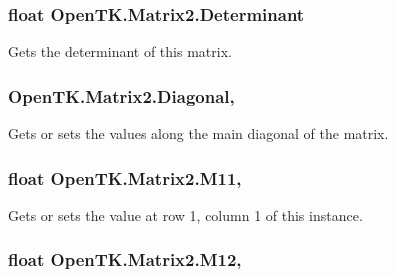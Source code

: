 \hypertarget{struct_open_t_k_1_1_matrix2_adcf885e885add38852d565b19b27a0e3}{
\subsubsection[{Determinant}]{\setlength{\rightskip}{0pt plus 5cm}float Open\-T\-K.\-Matrix2.\-Determinant\hspace{0.3cm}{\ttfamily [get]}}}\label{struct_open_t_k_1_1_matrix2_adcf885e885add38852d565b19b27a0e3}


Gets the determinant of this matrix. 

\hypertarget{struct_open_t_k_1_1_matrix2_af95195a62dda800e6466721bc6769bb1}{
\subsubsection[{Diagonal}]{ Open\-T\-K.\-Matrix2.\-Diagonal\hspace{0.3cm}{\ttfamily [get]}, {\ttfamily [set]}}}\label{struct_open_t_k_1_1_matrix2_af95195a62dda800e6466721bc6769bb1}


Gets or sets the values along the main diagonal of the matrix. 

\hypertarget{struct_open_t_k_1_1_matrix2_ac0096c57a845f57cad5b53117d97f90b}{
\subsubsection[{M11}]{\setlength{\rightskip}{0pt plus 5cm}float Open\-T\-K.\-Matrix2.\-M11\hspace{0.3cm}{\ttfamily [get]}, {\ttfamily [set]}}}\label{struct_open_t_k_1_1_matrix2_ac0096c57a845f57cad5b53117d97f90b}


Gets or sets the value at row 1, column 1 of this instance. 

\hypertarget{struct_open_t_k_1_1_matrix2_a20a739651456601282e0714c0e8a3f20}{
\subsubsection[{M12}]{\setlength{\rightskip}{0pt plus 5cm}float Open\-T\-K.\-Matrix2.\-M12\hspace{0.3cm}{\ttfamily [get]}, {\ttfamily [set]}}}\label{struct_open_t_k_1_1_matrix2_a20a739651456601282e0714c0e8a3f20}


